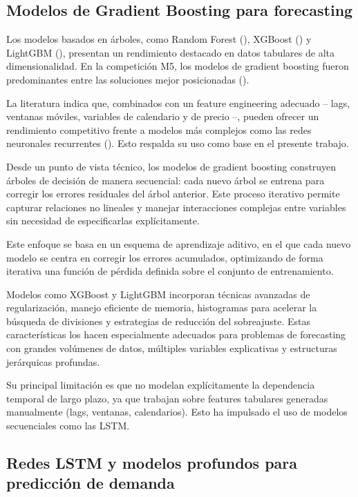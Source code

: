 \documentclass[IB,BIB]{TFUOC}%
\begin{document}
\subsection{Modelos de Gradient Boosting para forecasting}

Los modelos basados en árboles, como Random Forest (\cite{Breiman2001}),
XGBoost (\cite{chen2016xgboost}) y LightGBM (\cite{ke2017lightgbm}), presentan
un rendimiento destacado en datos tabulares de alta dimensionalidad. En
la competición M5, los modelos de gradient boosting fueron predominantes
entre las soluciones mejor posicionadas (\cite{makridakis2021}).

La literatura indica que, combinados con un feature engineering adecuado
-- lags, ventanas móviles, variables de calendario y de precio --,
pueden ofrecer un rendimiento competitivo frente a modelos más complejos
como las redes neuronales recurrentes (\cite{hewamalage2021}). Esto
respalda su uso como base en el presente trabajo.

Desde un punto de vista técnico, los modelos de
gradient boosting construyen árboles de decisión de manera secuencial:
cada nuevo árbol se entrena para corregir los errores residuales del
árbol anterior. Este proceso iterativo permite capturar relaciones no
lineales y manejar interacciones complejas entre variables sin necesidad
de especificarlas explícitamente.

Este enfoque se basa en un esquema de aprendizaje
aditivo, en el que cada nuevo modelo se centra en corregir los errores
acumulados, optimizando de forma iterativa una función de pérdida
definida sobre el conjunto de entrenamiento.

Modelos como XGBoost y LightGBM incorporan técnicas
avanzadas de regularización, manejo eficiente de memoria, histogramas
para acelerar la búsqueda de divisiones y estrategias de reducción del
sobreajuste. Estas características los hacen especialmente adecuados
para problemas de forecasting con grandes volúmenes de datos, múltiples
variables explicativas y estructuras jerárquicas profundas.

Su principal limitación es que no modelan
explícitamente la dependencia temporal de largo plazo, ya que trabajan
sobre features tabulares generadas manualmente (lags, ventanas,
calendarios). Esto ha impulsado el uso de modelos secuenciales como las
LSTM.

\subsection{Redes LSTM y modelos profundos para predicción de demanda}
\end{document}
